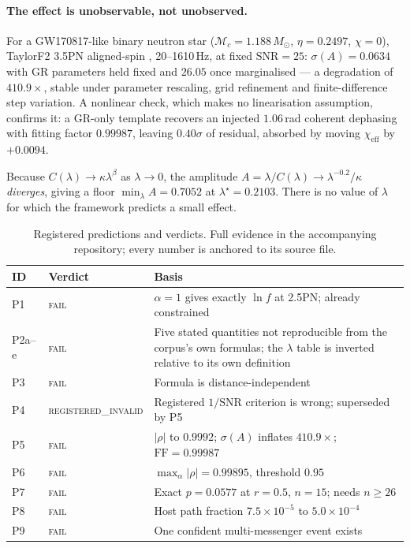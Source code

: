 \documentclass[11pt,a4paper]{article}
\newcommand{\verdict}[1]{\textsc{#1}}
\begin{document}
\paragraph{The effect is unobservable, not unobserved.} For a GW170817-like
binary neutron star ($\mathcal{M}_c = 1.188\,M_\odot$, $\eta = 0.2497$,
$\chi = 0$), TaylorF2 3.5PN aligned-spin \cite{buonanno2009comparison},
20--1610\,Hz, at fixed $\mathrm{SNR}=25$: $\sigma(A) = 0.0634$ with GR
parameters held fixed and $26.05$ once marginalised --- a degradation of
$410.9\times$, stable under parameter rescaling, grid refinement and
finite-difference step variation. A nonlinear check, which makes no
linearisation assumption, confirms it: a GR-only template recovers an injected
$1.06$\,rad coherent dephasing with fitting factor $0.99987$, leaving
$0.40\sigma$ of residual, absorbed by moving $\chi_{\mathrm{eff}}$ by $+0.0094$.

Because $C(\lambda) \to \kappa\lambda^\beta$ as $\lambda \to 0$, the amplitude
$A = \lambda/C(\lambda) \to \lambda^{-0.2}/\kappa$ \emph{diverges}, giving a
floor $\min_\lambda A = 0.7052$ at $\lambda^\star = 0.2103$. There is no value
of $\lambda$ for which the framework predicts a small effect.

\begin{table}[t]
\centering
\caption{Registered predictions and verdicts. Full evidence in the
accompanying repository; every number is anchored to its source file.}
\label{tab:gw}
\small
\begin{tabular}{llp{7.4cm}}
\toprule
ID & Verdict & Basis \\
\midrule
P1 & \verdict{fail} & $\alpha=1$ gives exactly $\ln f$ at 2.5PN; already constrained \\
P2a--e & \verdict{fail} & Five stated quantities not reproducible from the corpus's own formulas; the $\lambda$ table is inverted relative to its own definition \\
P3 & \verdict{fail} & Formula is distance-independent \\
P4 & \verdict{registered\_invalid} & Registered $1/\mathrm{SNR}$ criterion is wrong; superseded by P5 \\
P5 & \verdict{fail} & $|\rho|$ to $0.9992$; $\sigma(A)$ inflates $410.9\times$; $\mathrm{FF}=0.99987$ \\
P6 & \verdict{fail} & $\max_\alpha|\rho| = 0.99895$, threshold $0.95$ \\
P7 & \verdict{fail} & Exact $p = 0.0577$ at $r=0.5$, $n=15$; needs $n \geq 26$ \\
P8 & \verdict{fail} & Host path fraction $7.5\times10^{-5}$ to $5.0\times10^{-4}$ \\
P9 & \verdict{fail} & One confident multi-messenger event exists \\
\bottomrule
\end{tabular}
\end{table}
\end{document}
